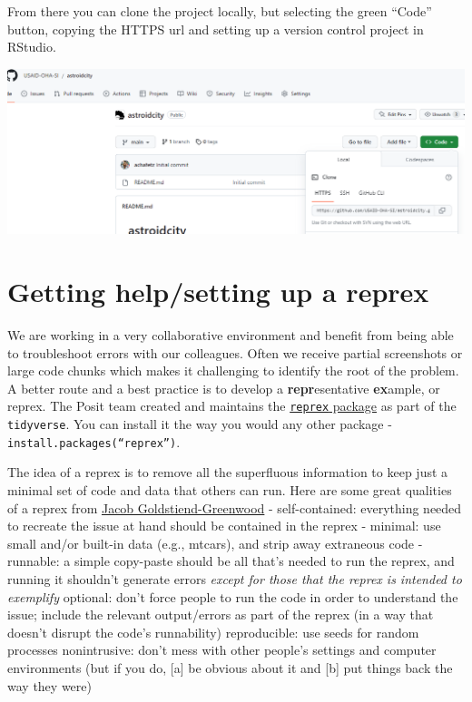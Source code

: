 \documentclass[
  letterpaper,
  DIV=11,
  numbers=noendperiod]{scrreprt}
\begin{document}
From there you can clone the project locally, but selecting the green
``Code'' button, copying the HTTPS url and setting up a version control
project in RStudio.

\includegraphics{./images/image19 - new repo done.png}

\hypertarget{getting-helpsetting-up-a-reprex}{%
\chapter{Getting help/setting up a
reprex}\label{getting-helpsetting-up-a-reprex}}

We are working in a very collaborative environment and benefit from
being able to troubleshoot errors with our colleagues. Often we receive
partial screenshots or large code chunks which makes it challenging to
identify the root of the problem. A better route and a best practice is
to develop a \textbf{repr}esentative \textbf{ex}ample, or reprex. The
Posit team created and maintains the
\href{reprex.tidyverse.org/index.html}{\texttt{reprex} package} as part
of the \texttt{tidyverse}. You can install it the way you would any
other package - \texttt{install.packages(“reprex”)}.

The idea of a reprex is to remove all the superfluous information to
keep just a minimal set of code and data that others can run. Here are
some great qualities of a reprex from
\href{https://data.library.virginia.edu/ask-better-code-questions-and-get-better-answers-with-reprex/}{Jacob
Goldstiend-Greenwood} - self-contained: everything needed to recreate
the issue at hand should be contained in the reprex - minimal: use small
and/or built-in data (e.g., mtcars), and strip away extraneous code -
runnable: a simple copy-paste should be all that's needed to run the
reprex, and running it shouldn't generate errors \emph{except for those
that the reprex is intended to exemplify} optional: don't force people
to run the code in order to understand the issue; include the relevant
output/errors as part of the reprex (in a way that doesn't disrupt the
code's runnability) reproducible: use seeds for random processes
nonintrusive: don't mess with other people's settings and computer
environments (but if you do, {[}a{]} be obvious about it and {[}b{]} put
things back the way they were)
\end{document}
